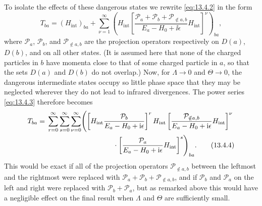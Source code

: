 To isolate the effects of these dangerous states we rewrite
\eqref{eq:13.4.2} in the form
\begin{equation}
T_{ba}=(H_{\mathrm{int}})_{ba}
+\sum_{\nu=1}^{\infty}
\left(H_{\mathrm{int}}
\left[\frac{\mathcal P_a+\mathcal P_b+\mathcal P_{\notin a,b}}
{E_a-H_0+\ii\epsilon}H_{\mathrm{int}}\right]^\nu\right)_{ba},
\tag{13.4.3}\label{eq:13.4.3}
\end{equation}
where $\mathcal P_a$, $\mathcal P_b$, and $\mathcal P_{\notin a,b}$ are the
projection operators respectively on $D(a)$, $D(b)$, and on all other states.
(It is assumed here that none of the charged particles in $b$ have momenta
close to that of some charged particle in $a$, so that the sets $D(a)$ and
$D(b)$ do not overlap.) Now, for $\Lambda\to0$ and $\Theta\to0$, the dangerous
intermediate states occupy so little phase space that they may be neglected
wherever they do not lead to infrared divergences. The power series
\eqref{eq:13.4.3} therefore becomes
\begin{align}
T_{ba}={}&\sum_{r=0}^{\infty}\sum_{s=0}^{\infty}
\sum_{\nu=0}^{\infty}
\Biggl(
\left[H_{\mathrm{int}}\frac{\mathcal P_b}{E_a-H_0+\ii\epsilon}\right]^r
H_{\mathrm{int}}
\left[\frac{\mathcal P_{\notin a,b}}{E_a-H_0+\ii\epsilon}
H_{\mathrm{int}}\right]^\nu\notag\\
&\hspace{33mm}\cdot
\left[\frac{\mathcal P_a}{E_a-H_0+\ii\epsilon}
H_{\mathrm{int}}\right]^s
\Biggr)_{ba}.
\tag{13.4.4}\label{eq:13.4.4}
\end{align}
This would be exact if all of the projection operators
$\mathcal P_{\notin a,b}$ between the leftmost and the rightmost were replaced
with $\mathcal P_a+\mathcal P_b+\mathcal P_{\notin a,b}$, and if
$\mathcal P_b$ and $\mathcal P_a$ on the left and right were replaced with
$\mathcal P_b+\mathcal P_a$, but as remarked above this would have a negligible
effect on the final result when $\Lambda$ and $\Theta$ are sufficiently small.


